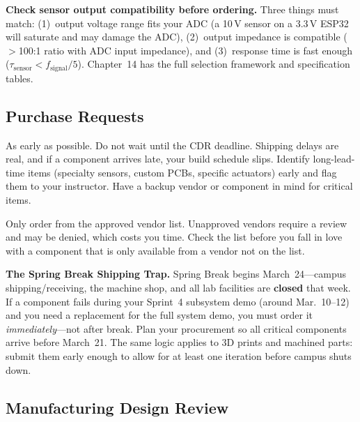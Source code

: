 \begin{tipbox}
\textbf{Check sensor output compatibility before ordering.} Three things must match: (1)~output voltage range fits your ADC (a 10\,V sensor on a 3.3\,V ESP32 will saturate and may damage the ADC), (2)~output impedance is compatible ($>$100:1 ratio with ADC input impedance), and (3)~response time is fast enough ($\tau_{\text{sensor}} < f_{\text{signal}}/5$). Chapter~14 has the full selection framework and specification tables.
\end{tipbox}

\subsection{Purchase Requests}

\begin{faqbox}
As early as possible. Do not wait until the CDR deadline. Shipping delays are real, and if a component arrives late, your build schedule slips. Identify long-lead-time items (specialty sensors, custom PCBs, specific actuators) early and flag them to your instructor. Have a backup vendor or component in mind for critical items.
\end{faqbox}

\begin{warnbox}
Only order from the approved vendor list. Unapproved vendors require a review and may be denied, which costs you time. Check the list before you fall in love with a component that is only available from a vendor not on the list.
\end{warnbox}

\begin{warnbox}
\textbf{The Spring Break Shipping Trap.} Spring Break begins March~24---campus shipping/receiving, the machine shop, and all lab facilities are \textbf{closed} that week. If a component fails during your Sprint~4 subsystem demo (around Mar.~10--12) and you need a replacement for the full system demo, you must order it \textit{immediately}---not after break. Plan your procurement so all critical components arrive before March~21. The same logic applies to 3D prints and machined parts: submit them early enough to allow for at least one iteration before campus shuts down.
\end{warnbox}

\subsection{Manufacturing Design Review}

